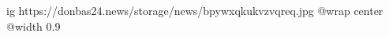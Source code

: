  
 
 
 
 

\ifcmt
  ig https://donbas24.news/storage/news/bpywxqkukvzvqreq.jpg
  @wrap center
  @width 0.9
\fi
